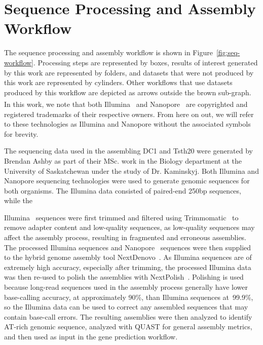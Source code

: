 \section{Sequence Processing and Assembly Workflow}\label{met:seq-workflow}

The sequence processing and assembly workflow is shown in Figure~\ref{fig:seq-workflow}. Processing steps are represented by boxes,
results of interest generated by this work are represented by folders,
and datasets that were not produced by this work are represented by
cylinders. Other workflows that use datasets produced by this workflow
are depicted as arrows outside the brown sub-graph. In this work, we note that both Illumina~\textsuperscript{\textcopyright\textregistered} and Nanopore~\textsuperscript{\textcopyright\textregistered} are copyrighted and registered trademarks of their respective owners. From here on out, we will refer to these technologies as Illumina and Nanopore without the associated symbols for brevity.

The sequencing data used in the assembling DC1 and Tsth20 were generated by Brendan Ashby as part of their MSc. work in the Biology department at the University of Saskatchewan under the study of Dr. Kaminskyj. Both Illumina and Nanopore sequencing technologies were used to generate genomic sequences for both organisms. The Illumina data consisted of paired-end 250bp sequences, while the  

Illumina~\cite{bennett2004a} sequences were first trimmed and filtered using Trimmomatic~\cite{bolger2014a} to remove adapter content and low-quality sequences, as low-quality sequences may affect the assembly process, resulting in fragmented and erroneous assemblies. The processed Illumina sequences and Nanopore~\cite{wang2021a} sequences were then supplied to the hybrid genome assembly tool NextDenovo~\cite{hu2024a}. As Illumina sequences are of extremely high accuracy, especially after trimming, the processed Illumina data was then re-used to polish the assemblies with NextPolish~\cite{hu2020a}. Polishing is used because long-read sequences used in the assembly process generally have lower base-calling accuracy, at approximately 90\%, than Illumina sequences at~99.9\%, so the Illumina data can be used to correct any assembled sequences that may contain base-call errors. The resulting assemblies were then analyzed to identify AT-rich genomic sequence, analyzed with QUAST for general assembly metrics, and then used as input in the gene prediction workflow.

